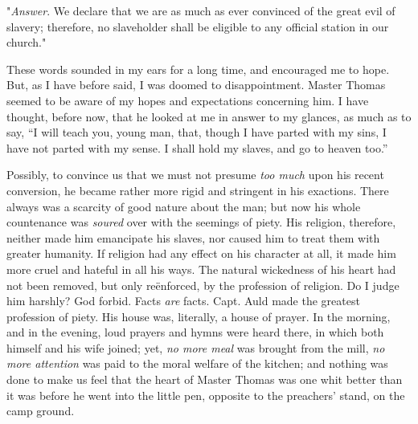 "\emph{Answer}. We declare that we are as much as ever convinced of the
great evil of slavery; therefore, no slaveholder shall be eligible to
any official station in our church."

These words sounded in my ears for a long time, and encouraged me to
hope. But, as I have before said, I was doomed to disappointment. Master
Thomas seemed to be aware of my hopes and expectations concerning him. I
have thought, before now, that he looked at me in answer to my glances,
as much as to say, ``I will teach you, young man, that, though I have
parted with my sins, I have not parted with my sense. I shall hold my
slaves, and go to heaven too.''

Possibly, to convince us that we must not presume \emph{too much} upon
his recent conversion, he became rather more rigid and stringent in his
exactions. There always was a scarcity of good nature about the man; but
now his whole countenance was \emph{soured} over with the seemings of
piety. His {\protect\hypertarget{197}{}{}}religion, therefore, neither
made him emancipate his slaves, nor caused him to treat them with
greater humanity. If religion had any effect on his character at all, it
made him more cruel and hateful in all his ways. The natural wickedness
of his heart had not been removed, but only reënforced, by the
profession of religion. Do I judge him harshly? God forbid. Facts
\emph{are} facts. Capt. Auld made the greatest profession of piety. His
house was, literally, a house of prayer. In the morning, and in the
evening, loud prayers and hymns were heard there, in which both himself
and his wife joined; yet, \emph{no more meal} was brought from the mill,
\emph{no more attention} was paid to the moral welfare of the kitchen;
and nothing was done to make us feel that the heart of Master Thomas was
one whit better than it was before he went into the little pen, opposite
to the preachers' stand, on the camp ground.

